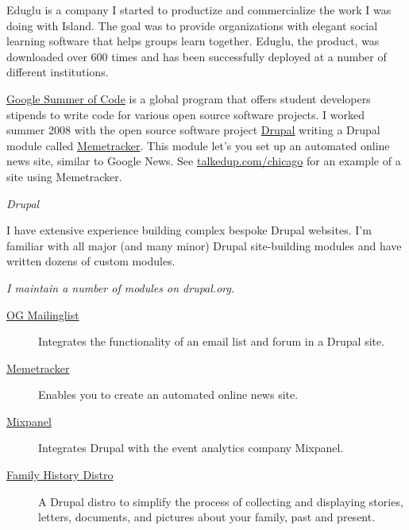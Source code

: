 \documentclass[11pt]{article}
\begin{document}
\bigskip


\noindent Eduglu is a company I started to productize and commercialize the work I was doing with Island. The goal was to provide organizations with elegant social learning software that helps groups learn together. Eduglu, the product, was downloaded over 600 times and has been successfully deployed at a number of different institutions.

\bigskip


\noindent\href{http://code.google.com/soc/}{Google Summer of Code} is a global program that offers student developers stipends to write code for various open source software projects. I worked summer 2008 with the open source software project \href{http://drupal.org}{Drupal} writing a Drupal module called \href{http://drupal.org/project/memetracker}{Memetracker}. This module let's you set up an automated online news site, similar to Google News. See \href{http://www.talkedup.com/chicago}{talkedup.com/chicago} for an example of a site using Memetracker.

\bigskip



\medskip

\noindent\emph{Drupal \vspace{0.15in}}

\noindent I have extensive experience building complex bespoke Drupal websites. I'm familiar with all major (and many minor) Drupal site-building modules and have written dozens of custom modules.

\bigskip

\noindent \emph{I maintain a number of modules on drupal.org.}

\begin{description}
  \item[\href{http://drupal.org/project/og_mailinglist}{OG Mailinglist}] Integrates the functionality of an email list and forum in a Drupal site.
  \item[\href{http://drupal.org/project/memetracker}{Memetracker}] Enables you to create an automated online news site.
  \item[\href{http://drupal.org/project/mixpanel}{Mixpanel}] Integrates Drupal with the event analytics company Mixpanel.
  \item[\href{http://drupal.org/project/family_history}{Family History Distro}] A Drupal distro to simplify the process of collecting and displaying stories, letters, documents, and pictures about your family, past and present.
\end{description}
\end{document}
